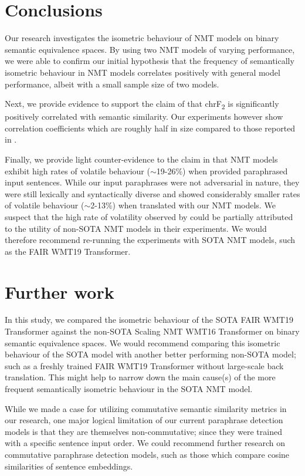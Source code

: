 \documentclass[11pt,a4paper]{article}
\begin{document}
\section{Conclusions}

Our research investigates the isometric behaviour of NMT models on binary semantic equivalence spaces. By using two NMT models of varying performance, we were able to confirm our initial hypothesis that the frequency of semantically isometric behaviour in NMT models correlates positively with general model performance, albeit with a small sample size of two models. 

Next, we provide evidence to support the claim of \citet{michel2019evaluation} that chrF\textsubscript{2} is significantly positively correlated with semantic similarity. Our experiments however show correlation coefficients which are roughly half in size compared to those reported in \citet{michel2019evaluation}.

Finally, we provide light counter-evidence to the claim in \citet{fadaee2020unreasonable} that NMT models exhibit high rates of volatile behaviour ($\sim$19-26$\%$) when provided paraphrased input sentences. While our input paraphrases were not adversarial in nature, they were still lexically and syntactically diverse and showed considerably smaller rates of volatile behaviour ($\sim$2-13$\%$) when translated with our NMT models. We suspect that the high rate of volatility observed by \citet{fadaee2020unreasonable} could be partially attributed to the utility of non-SOTA NMT models in their experiments. We would therefore recommend re-running the experiments with SOTA NMT models, such as the FAIR WMT19 Transformer. 

\section{Further work}

In this study, we compared the isometric behaviour of the SOTA FAIR WMT19 Transformer against the non-SOTA Scaling NMT WMT16 Transformer on binary semantic equivalence spaces. We would recommend comparing this isometric behaviour of the SOTA model with another better performing non-SOTA model; such as a freshly trained FAIR WMT19 Transformer without large-scale back translation. This might help to narrow down the main cause(s) of the more frequent semantically isometric behaviour in the SOTA NMT model.

While we made a case for utilizing commutative semantic similarity metrics in our research, one major logical limitation of our current paraphrase detection models is that they are themselves non-commutative; since they were trained with a specific sentence input order. We could recommend further research on commutative paraphrase detection models, such as those which compare cosine similarities of sentence embeddings.
\end{document}
